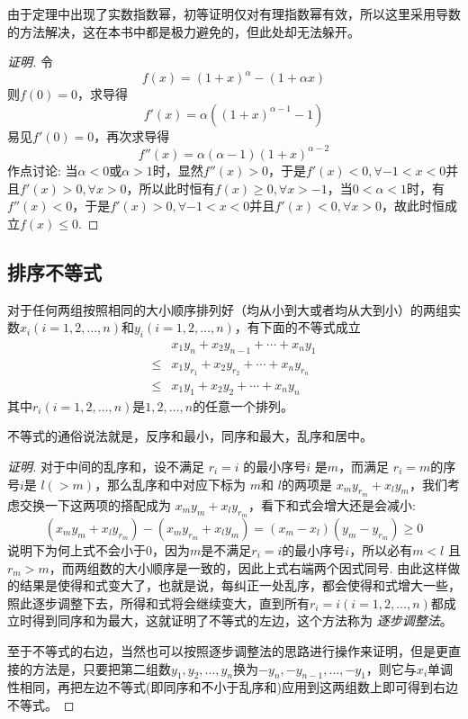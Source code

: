 由于定理中出现了实数指数幂，初等证明仅对有理指数幂有效，所以这里采用导数的方法解决，这在本书中都是极力避免的，但此处却无法躲开。
\begin{proof}[证明]
  令
  \[ f(x)=(1+x)^{\alpha}-(1+\alpha x) \]
  则$f(0)=0$，求导得
  \[ f'(x) = \alpha ((1+x)^{\alpha-1}-1) \]
  易见$f'(0)=0$，再次求导得
  \[ f''(x) = \alpha(\alpha-1)(1+x)^{\alpha-2} \]
  作点讨论: 当$\alpha<0$或$\alpha>1$时，显然$f''(x)>0$，于是$f'(x)<0, \forall -1<x<0$并且$f'(x)>0, \forall x>0$，所以此时恒有$f(x) \geqslant 0, \forall x>-1$，当$0<\alpha<1$时，有$f''(x)<0$，于是$f'(x)>0, \forall -1<x<0$并且$f'(x)<0, \forall x>0$，故此时恒成立$f(x) \leqslant 0$.
\end{proof}

\subsection{排序不等式}

\begin{theorem}[排序不等式]
  对于任何两组按照相同的大小顺序排列好（均从小到大或者均从大到小）的两组实数$x_i(i=1,2,\ldots,n)$和$y_i(i=1,2,\ldots,n)$，有下面的不等式成立
  \begin{eqnarray}
    \label{eq:rearrangement inequality}
    & x_1y_n+x_2y_{n-1}+\cdots+x_ny_1 \nonumber \\
    \leqslant & x_1y_{r_1}+x_2y_{r_2}+\cdots+x_ny_{r_n} \nonumber \\
    \leqslant & x_1y_1+x_2y_2+\cdots+x_ny_n
  \end{eqnarray}
  其中$r_i(i=1,2,\ldots,n)$是$1,2,\ldots,n$的任意一个排列。
\end{theorem}
不等式的通俗说法就是，反序和最小，同序和最大，乱序和居中。

\begin{proof}[证明]
  对于中间的乱序和，设不满足 $r_i = i$ 的最小序号$i$ 是$m$，而满足 $r_i=m$的序号$i$是 $l(>m)$，那么乱序和中对应下标为 $m$和 $l$的两项是 $x_my_{r_m}+x_ly_m$，我们考虑交换一下这两项的搭配成为 $x_my_m+x_ly_{r_m}$，看下和式会增大还是会减小:
  \[ (x_my_m+x_ly_{r_m}) - (x_my_{r_m}+x_ly_m) = (x_m-x_l)(y_m-y_{r_m}) \geqslant 0 \]
  说明下为何上式不会小于0，因为$m$是不满足$r_i=i$的最小序号$i$，所以必有$m<l$ 且 $r_m>m$，而两组数的大小顺序是一致的，因此上式右端两个因式同号.
  由此这样做的结果是使得和式变大了，也就是说，每纠正一处乱序，都会使得和式增大一些，照此逐步调整下去，所得和式将会继续变大，直到所有$r_i=i(i=1,2,\ldots,n)$都成立时得到同序和为最大，这就证明了不等式的左边，这个方法称为 \emph{逐步调整法}。

  至于不等式的右边，当然也可以按照逐步调整法的思路进行操作来证明，但是更直接的方法是，只要把第二组数$y_1,y_2,\ldots,y_n$换为$-y_n,-y_{n-1},\ldots,-y_1$，则它与$x_i$单调性相同，再把左边不等式(即同序和不小于乱序和)应用到这两组数上即可得到右边不等式。
\end{proof}

